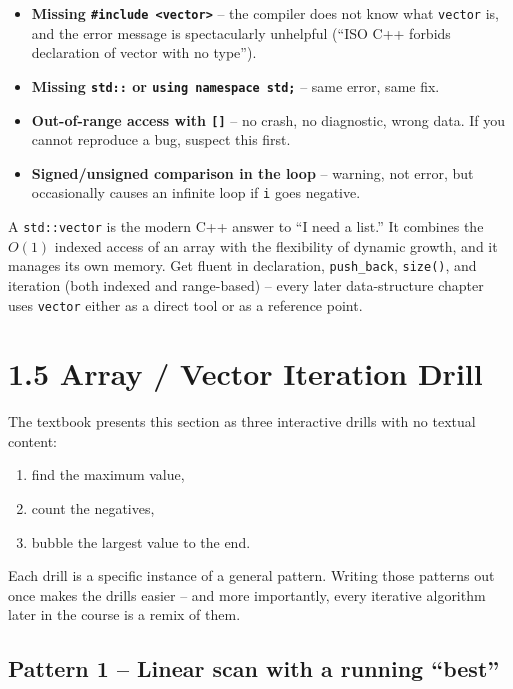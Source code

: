 \documentclass[11pt]{article}
\begin{document}
\begin{itemize}
    \item \textbf{Missing \texttt{\#include <vector>}} -- the compiler
          does not know what \texttt{vector} is, and the error message
          is spectacularly unhelpful (``ISO C++ forbids declaration of
          vector with no type'').
    \item \textbf{Missing \texttt{std::} or \texttt{using namespace std;}}
          -- same error, same fix.
    \item \textbf{Out-of-range access with \texttt{[]}} -- no crash, no
          diagnostic, wrong data. If you cannot reproduce a bug,
          suspect this first.
    \item \textbf{Signed/unsigned comparison in the loop} -- warning,
          not error, but occasionally causes an infinite loop if
          \texttt{i} goes negative.
\end{itemize}

\begin{ideabox}
A \texttt{std::vector} is the modern C++ answer to ``I need a list.''
It combines the $O(1)$ indexed access of an array with the flexibility
of dynamic growth, and it manages its own memory. Get fluent in
declaration, \texttt{push\_back}, \texttt{size()}, and iteration (both
indexed and range-based) -- every later data-structure chapter uses
\texttt{vector} either as a direct tool or as a reference point.
\end{ideabox}

\section{1.5 Array / Vector Iteration Drill}

The textbook presents this section as three interactive drills with no
textual content:
\begin{enumerate}
    \item find the maximum value,
    \item count the negatives,
    \item bubble the largest value to the end.
\end{enumerate}
Each drill is a specific instance of a general pattern. Writing those
patterns out once makes the drills easier -- and more importantly,
every iterative algorithm later in the course is a remix of them.

\subsection{Pattern 1 -- Linear scan with a running ``best''}
\end{document}
